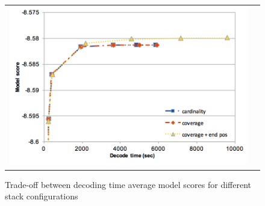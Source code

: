 \documentclass[11pt]{article}
\begin{document}
\begin{figure}[h]
\centering
\begin{tabular}{cc}
{\includegraphics[scale=0.4]{stack-configuration.png}} 
\end{tabular}
\caption{Trade-off between decoding time average model scores for different stack configurations}
\label{fig:stack-configuration}
\end{figure} 
\end{document}
